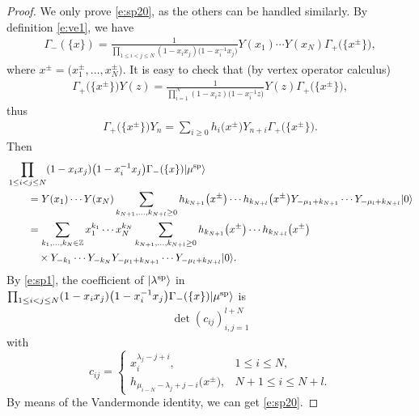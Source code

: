 \documentclass[10pt,a4paper]{amsart}
\numberwithin{equation}{section}
\begin{document}
\begin{proof} We only prove \eqref{e:sp20}, as the others can be handled similarly. By definition \eqref{e:ve1}, we have
\begin{align*}
\Gamma_-(\{x\})=\frac{1}{\prod_{1\leq i<j\leq N}(1-x_ix_j)\big(1-x^{-1}_ix_j\big)}Y(x_1)\cdots Y(x_N)\Gamma_+\big(\big\{x^\pm\big\}\big),
\end{align*}
where $x^\pm=\big(x^\pm_1,\dots,x^\pm_N\big)$. It is easy to check that (by vertex operator calculus)
\begin{align*}
\Gamma_+\big(\big\{x^\pm\big\}\big)Y(z)=\frac{1}{\prod^N_{i=1}(1-x_iz)\big(1-x^{-1}_iz\big)}Y(z)\Gamma_+\big(\big\{x^\pm\big\}\big),
\end{align*}
thus
\begin{align*}
\Gamma_+\big(\big\{x^\pm\big\}\big)Y_n=\sum_{i\geq 0}h_i\big(x^\pm\big)Y_{n+i}\Gamma_+\big(\big\{x^\pm\big\}\big).
\end{align*}
Then
\begin{align*}
&\prod_{1\leq i<j\leq N}(1-x_ix_j)\big(1-x^{-1}_ix_j\big)\Gamma_-(\{x\})|\mu^{\rm sp}\rangle\\
&\qquad{}=Y(x_1)\cdots Y(x_N)\sum_{k_{N+1},\dots,k_{N+l}\geq 0}h_{k_{N+1}}\big(x^\pm\big)\cdots h_{k_{N+l}}\big(x^\pm\big)Y_{-\mu_1+k_{N+1}}\cdots Y_{-\mu_l+k_{N+l}}|0\rangle\\
&\qquad{}=\sum_{k_1,\dots,k_N\in \mathbb{Z}}x^{k_1}_1\cdots x^{k_N}_N\sum_{k_{N+1},\dots,k_{N+l}\geq 0}h_{k_{N+1}}\big(x^\pm\big)\cdots h_{k_{N+l}}\big(x^\pm\big)\\
&\qquad\quad{} \times Y_{-k_1}\cdots Y_{-k_N} Y_{-\mu_1+k_{N+1}}\cdots Y_{-\mu_l+k_{N+l}}|0\rangle.
\end{align*}
By \eqref{e:sp1}, the coefficient of $|\lambda^{\rm sp}\rangle$ in $\prod_{1\leq i<j\leq N}(1-x_ix_j)\big(1-x^{-1}_ix_j\big)\Gamma_-(\{x\})|\mu^{\rm sp}\rangle$ is
\begin{align*}
\det(c_{ij})^{l+N}_{i,j=1}
\end{align*}
with
\[
c_{ij}=\begin{cases}
x^{\lambda_j-j+i}_i, & 1\leq i\leq N,\\
h_{\mu_{i-N}-\lambda_j+j-i}\big(x^{\pm}\big), & N+1\leq i\leq N+l.
\end{cases}
\]
By means of the Vandermonde identity, we can get \eqref{e:sp20}.
\end{proof}
\end{document}
